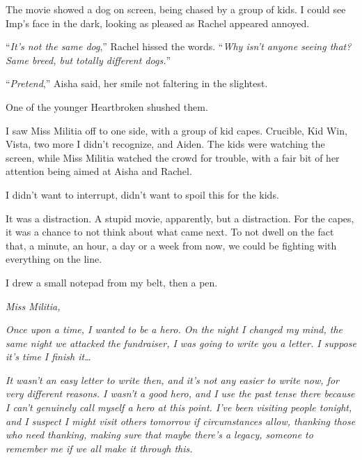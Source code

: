 The movie showed a dog on screen, being chased by a group of kids.  I could see Imp's face in the dark, looking as pleased as Rachel appeared annoyed.



``\emph{It's not the same dog},'' Rachel hissed the words.  ``\emph{Why isn't anyone seeing that?  Same breed, but totally different dogs.}''



``\emph{Pretend},'' Aisha said, her smile not faltering in the slightest.



One of the younger Heartbroken shushed them.



I saw Miss Militia off to one side, with a group of kid capes.  Crucible, Kid Win, Vista, two more I didn't recognize, and Aiden.  The kids were watching the screen, while Miss Militia watched the crowd for trouble, with a fair bit of her attention being aimed at Aisha and Rachel.



I didn't want to interrupt, didn't want to spoil this for the kids.



It was a distraction.  A stupid movie, apparently, but a distraction.  For the capes, it was a chance to not think about what came next.  To not dwell on the fact that, a minute, an hour, a day or a week from now, we could be fighting with everything on the line.



I drew a small notepad from my belt, then a pen.



\emph{Miss Militia,}



\emph{Once upon a time, I wanted to be a hero.  On the night I changed my mind, the same night we attacked the fundraiser, I was going to write you a letter.  I suppose it's time I finish it\ldots}



\emph{It wasn't an easy letter to write then, and it's not any easier to write now, for very different reasons.  I wasn't a good hero, and I use the past tense there because I can't genuinely call myself a hero at this point.  I've been visiting people tonight, and I suspect I might visit others tomorrow if circumstances allow, thanking those who need thanking, making sure that maybe there's a legacy, someone to remember me if we all make it through this.}




